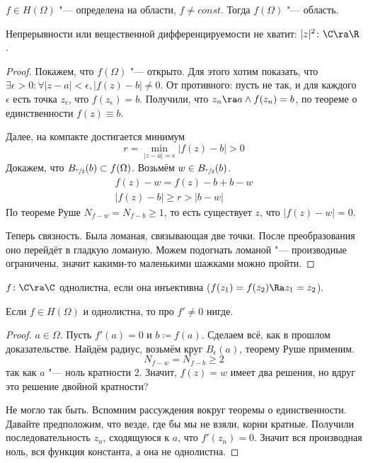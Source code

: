 \begin{Def}
	$f \in H(\Omega)$ "--- определена на области, $f \ne const$.
	Тогда $f(\Omega)$ "--- область.
\end{Def}
\begin{Rem}
	Непрерывности или вещественной дифференцируемости не хватит: $|z|^2\colon \C \ra \R$.
\end{Rem}
\begin{proof}
	Покажем, что $f(\Omega)$ "--- открыто.
	Для этого хотим показать, что $\exists \epsilon > 0\colon \forall |z-a|<\epsilon, |f(z) - b| \ne 0$.
	От противного: пусть не так, и для каждого $\epsilon$ есть точка $z_{\epsilon}$, что $f(z_{\epsilon}) = b$.
	Получили, что $z_n \ra a \land f(z_n) = b$, по теореме о единственности $f(z) \equiv b$.

	Далее, на компакте достигается минимум
	\[ r = \min_{|z-a| = \epsilon} |f(z) - b| > 0 \]
	Докажем, что $B_{\sfrac r2}(b) \subset f(\Omega)$.
	Возьмём $w \in B_{\sfrac r2}(b)$.
	\begin{gather*}
		f(z) - w = f(z) - b + b - w \\
		|f(z) - b| \ge r > |b - w|
	\end{gather*}
	По теореме Руше $N_{f-w} = N_{f-b} \ge 1$, то есть существует $z$, что $|f(z) - w| = 0$.

	Теперь связность.
	Была ломаная, связывающая две точки.
	После преобразования оно перейдёт в гладкую ломаную.
	Можем подогнать ломаной "--- производные ограничены, значит какими-то маленькими шажками можно пройти.
\end{proof}

\begin{Def}
	$f\colon \C \ra \C$ однолистна, если она инъективна ($f(z_1) = f(z_2) \Ra z_1 = z_2$).
\end{Def}

\begin{theorem}
	Если $f \in H(\Omega)$ и однолистна, то про $f' \ne 0$ нигде.
\end{theorem}
\begin{proof}
	$a \in \Omega$. Пусть $f'(a) = 0$ и $b \coloneq f(a)$.
	Сделаем всё, как в прошлом доказательстве.
	Найдём радиус, возьмём круг $B_{\epsilon}(a)$, теорему Руше применим.
	\[ N_{f-w} = N_{f-b} \ge 2 \]
	так как $a$ "--- ноль кратности 2.
	Значит, $f(z) = w$ имеет два решения, но вдруг это решение двойной кратности?

	Не могло так быть. Вспомним рассуждения вокруг теоремы о единственности.
	Давайте предположим, что везде, где бы мы не взяли, корни кратные.
	Получили последовательность $z_n$, сходящуюся к $a$, что $f'(z_n) = 0$.
	Значит вся производная ноль, вся функция константа, а она не однолистна.
\end{proof}
